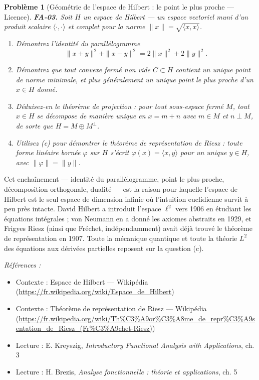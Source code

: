 \documentclass[11pt]{article}
\newtheorem{problem}{Problème}
\newenvironment{refs}{\par\small\noindent\emph{Références :}\begin{itemize}\setlength\itemsep{0pt}}{\end{itemize}\normalsize}
\begin{document}
\begin{problem}[{Géométrie de l'espace de Hilbert : le point le plus proche --- Licence}]
\textbf{FA-03.} Soit $ H $ un espace de Hilbert --- un espace vectoriel muni d'un produit
scalaire $ \langle\cdot,\cdot\rangle $ et complet pour la norme
$ \|x\| = \sqrt{\langle x, x\rangle} $.
\begin{enumerate}
\item[(a)] Démontrez l'identité du parallélogramme
\[ \|x+y\|^2 + \|x-y\|^2 = 2\|x\|^2 + 2\|y\|^2 . \]
\item[(b)] Démontrez que tout convexe fermé non vide $ C \subset H $ contient un unique point de norme
minimale, et plus généralement un unique point le plus proche d'un $ x \in H $ donné.
\item[(c)] Déduisez-en le théorème de projection : pour tout sous-espace fermé $ M $, tout $ x \in H $
se décompose de manière unique en $ x = m + n $ avec $ m \in M $ et $ n \perp M $, de sorte
que $ H = M \oplus M^{\perp} $.
\item[(d)] Utilisez (c) pour démontrer le théorème de représentation de Riesz : toute forme linéaire bornée
$ \varphi $ sur $ H $ s'écrit $ \varphi(x) = \langle x, y\rangle $ pour un unique
$ y \in H $, avec $ \|\varphi\| = \|y\| $.
\end{enumerate}

\end{problem}

\noindent Cet enchaînement --- identité du parallélogramme, point le plus proche, décomposition
orthogonale, dualité --- est la raison pour laquelle l'espace de Hilbert est le seul espace de dimension
infinie où l'intuition euclidienne survit à peu près intacte. David Hilbert a introduit l'espace
$ \ell^2 $ vers 1906 en étudiant les équations intégrales ; von Neumann en a donné les axiomes
abstraits en 1929, et Frigyes Riesz (ainsi que Fréchet, indépendamment) avait déjà trouvé le théorème
de représentation en 1907. Toute la mécanique quantique et toute la théorie $ L^2 $ des équations
aux dérivées partielles reposent sur la question (c).

\begin{refs}
\item Contexte : Espace de Hilbert --- Wikipédia (\url{https://fr.wikipedia.org/wiki/Espace_de_Hilbert})
\item Contexte : Théorème de représentation de Riesz --- Wikipédia (\url{https://fr.wikipedia.org/wiki/Th%C3%A9or%C3%A8me_de_repr%C3%A9sentation_de_Riesz_(Fr%C3%A9chet-Riesz)})
\item Lecture : E. Kreyszig, \textit{Introductory Functional Analysis with Applications}, ch. 3
\item Lecture : H. Brezis, \textit{Analyse fonctionnelle : théorie et applications}, ch. 5
\end{refs}
\end{document}
